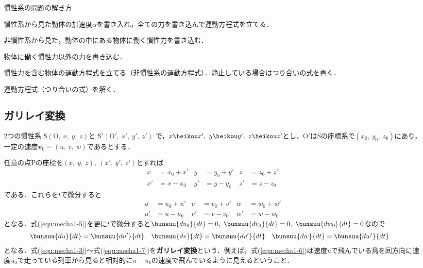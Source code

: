 慣性系の問題の解き方
\begin{enumerate}[label=\textbf{[\arabic*]}, labelsep=10pt, leftmargin=23pt]
	\item 慣性系から見た動体の加速度$\alpha$を書き入れ，全ての力を書き込んで運動方程式を立てる．
	\item 非慣性系から見た，動体の中にある物体に働く慣性力を書き込む．
	\item 物体に働く慣性力以外の力を書き込む．
	\item 慣性力を含む物体の運動方程式を立てる（非慣性系の運動方程式）．静止している場合はつり合いの式を書く．
	\item 運動方程式（つり合いの式）を解く．
\end{enumerate}



\subsection{ガリレイ変換}

2つの慣性系
$\mathrm{S}(\mathrm{O},\ x,\ y,\ z)$と
$\mathrm{S}'(\mathrm{O}',\ x',\ y',\ z')$
で，$x \heikou x',\ y \heikou y',\ z \heikou z'$とし，$\mathrm{O}'$は$\mathrm{S}$の座標系で$(x_0,\ y_0,\ z_0)$にあり，一定の速度$\bm{v}_0 = (u,\ v,\ w)$であるとする．

任意の点$\mathrm{P}$の座標を$(x,\ y,\ z),\ (x',\ y',\ z')$とすれば
\begin{align}
	x &= x_0 + x' & y &= y_0 + y' & z &= z_0 + z' \label{equ:mecha1-3}\\
	x' &= x - x_0 & y' &= y - y_0 & z' &= z - z_0 \label{equ:mecha1-4}
\end{align}
である．これらを$t$で微分すると
\begin{align}
	u &= u_0 + u' & v &= v_0 + v' & w &= w_0 + w' \label{equ:mecha1-5}\\
	u' &= u - u_0 & v' &= v - v_0 & w' &= w - w_0 \label{equ:mecha1-6}
\end{align}
となる．式(\ref{equ:mecha1-5})を更に$t$で微分すると$\bunsuu{du_0}{dt} = 0,\ \bunsuu{dv_0}{dt} = 0,\ \bunsuu{dw_0}{dt} = 0$なので
\begin{align}
	\bunsuu{du}{dt} &= \bunsuu{du'}{dt} &
	\bunsuu{dv}{dt} &= \bunsuu{dv'}{dt} &
	\bunsuu{dw}{dt} &= \bunsuu{dw'}{dt} \label{equ:mecha-7}
\end{align}
となる．式(\ref{equ:mecha1-3})～式(\ref{equ:mecha1-7})を\textbf{ガリレイ変換}という．例えば，式(\ref{equ:mecha1-6})は速度$u$で飛んでいる鳥を同方向に速度$u_0$で走っている列車から見ると相対的に$u - u_0$の速度で飛んでいるように見えるということ．

